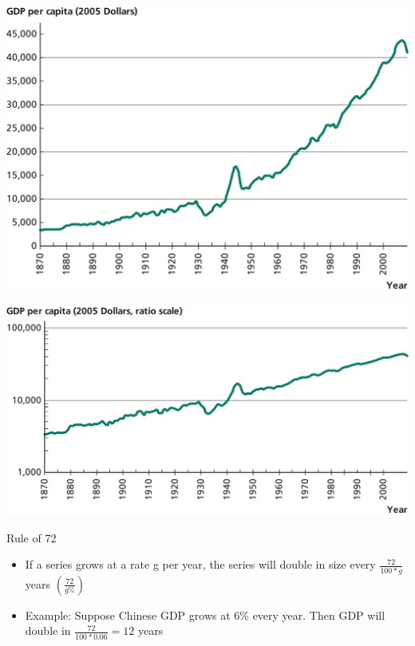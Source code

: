 \documentclass[10pt]{beamer}
\begin{document}
\begin{frame}[label={sec:orgb4dbdcc}]{}
\begin{center}
\includegraphics[width=.75\textwidth]{./img/1.2.png}
\end{center}
\end{frame}

\begin{frame}[label={sec:org15fc9f3}]{}
\begin{center}
\includegraphics[width=.75\textwidth]{./img/1.4.png}
\end{center}
\end{frame}

\begin{frame}[label={sec:org926642a}]{}
\alert{Rule of 72}
\begin{itemize}
\item If a series grows at a rate g per year, the series will double in size every \(\frac{72}{100*g}\) years \(\left(\frac{72}{g\%}\right)\)
\item Example: Suppose Chinese GDP grows at 6\% every year. Then GDP will double in \(\frac{72}{100*0.06} = 12\) years
\end{itemize}
\end{frame}
\end{document}
